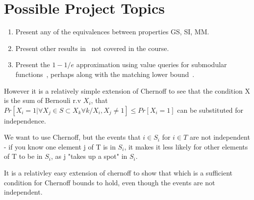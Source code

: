 \section{Possible Project Topics}
\begin{enumerate}
\item Present any of the equivalences between properties GS, SI, MM.
\item Present other results in~\cite{Paesleme16} not covered in the course.
\item Present the $1-1/e$ approximation using value queries for submodular functions~\cite{Vondrak??}, perhaps along with the matching lower bound~\cite{??}.
\end{enumerate}







However it is a relatively simple extension of Chernoff to see that the condition X is the sum of Bernouli r.v $X_i$, that $Pr[X_i = 1 | \forall X_j \in S \subset {X_k \forall k}/{X_i}, X_j \ne 1 ] \leq Pr[X_i = 1]$ can be substituted for independence.

We want to use Chernoff, but the events that $i \in S_i$ for $i \in T$ are not independent - if you know one element j of T is in $S_i$, it makes it less likely for other elements of T to be in $S_i$, as j "takes up a spot" in $S_i$.

It is a relativley easy extension of chernoff to show that  which is a sufficient condition for Chernoff bounds to hold, even though the events are not independent. 